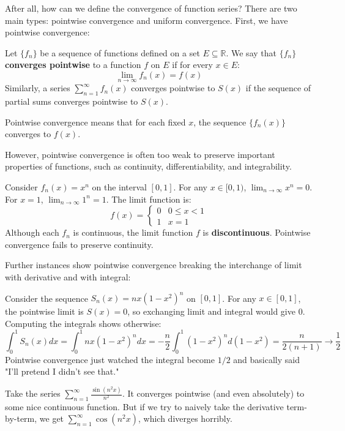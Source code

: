 After all, how can we define the convergence of function series? There are two main types: pointwise convergence and uniform convergence. First, we have pointwise convergence:

\begin{definition}
Let $\{f_n\}$ be a sequence of functions defined on a set $E \subseteq \mathbb{R}$. We say that $\{f_n\}$ \textbf{converges pointwise} to a function $f$ on $E$ if for every $x \in E$:
\[ \lim_{n \to \infty} f_n(x) = f(x) \]
Similarly, a series $\sum_{n=1}^{\infty} f_n(x)$ converges pointwise to $S(x)$ if the sequence of partial sums converges pointwise to $S(x)$.
\end{definition}

Pointwise convergence means that for each fixed $x$, the sequence $\{f_n(x)\}$ converges to $f(x)$.

However, pointwise convergence is often too weak to preserve important properties of functions, such as continuity, differentiability, and integrability.

\begin{example}
Consider $f_n(x) = x^n$ on the interval $[0, 1]$.
For any $x \in [0, 1)$, $\lim_{n \to \infty} x^n = 0$. For $x = 1$, $\lim_{n \to \infty} 1^n = 1$.
The limit function is:
\[ f(x) = \begin{cases} 0 & 0 \le x < 1 \\ 1 & x = 1 \end{cases} \]
Although each $f_n$ is continuous, the limit function $f$ is \textbf{discontinuous}. Pointwise convergence fails to preserve continuity.
\end{example}

Further instances show pointwise convergence breaking the interchange of limit with derivative and with integral:

\begin{example}
Consider the sequence $S_n(x) = nx(1-x^2)^n$ on $[0,1]$.
For any $x \in [0, 1]$, the pointwise limit is $S(x) = 0$, so exchanging limit and integral would give $0$. Computing the integrals shows otherwise:
\[ \int _0^1 S_n(x) dx = \int_0^1 nx(1-x^2)^n dx = -\frac{n}{2} \int_0^1 (1-x^2)^n d(1-x^2) = \frac{n}{2(n+1)} \to \frac{1}{2} \]
Pointwise convergence just watched the integral become $1/2$ and basically said "I'll pretend I didn't see that."
\end{example}

\begin{example}
Take the series $\sum_{n=1}^{\infty} \frac{\sin(n^2 x)}{n^2}$. It converges pointwise (and even absolutely) to some nice continuous function. But if we try to naively take the derivative term-by-term, we get $\sum_{n=1}^{\infty} \cos(n^2 x)$, which diverges horribly. 
\end{example}

